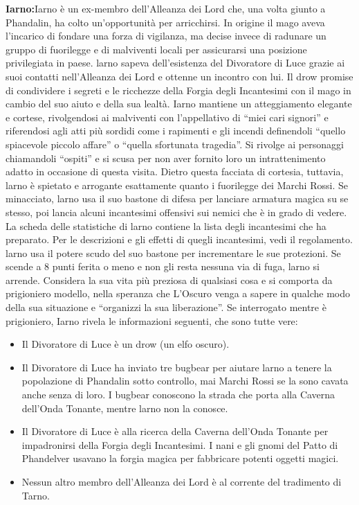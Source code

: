 \documentclass{article}
\begin{document}
\textbf{Iarno:}Iarno è un ex-membro dell'Alleanza dei Lord che, una volta
giunto a Phandalin, ha colto un'opportunità per arricchirsi.
In origine il mago aveva l’incarico di fondare una forza
di vigilanza, ma decise invece di radunare un gruppo di
fuorilegge e di malviventi locali per assicurarsi una posizione
privilegiata in paese.
larno sapeva dell'esistenza del Divoratore di Luce grazie ai suoi
contatti nell’Alleanza dei Lord e ottenne un incontro con lui.
Il drow promise di condividere i segreti e le ricchezze della
Forgia degli Incantesimi con il mago in cambio del suo aiuto e
della sua lealtà.
Iarno mantiene un atteggiamento
elegante e cortese, rivolgendosi ai
malviventi con l'appellativo di “miei
cari signori” e riferendosi agli atti più
sordidi come i rapimenti e gli incendi
definendoli “quello spiacevole piccolo
affare” o “quella sfortunata tragedia”.
Si rivolge ai personaggi chiamandoli
“ospiti” e si scusa per non aver fornito loro
un intrattenimento adatto in occasione
di questa visita. Dietro questa facciata
di cortesia, tuttavia, larno è spietato e
arrogante esattamente quanto i fuorilegge
dei Marchi Rossi.
Se minacciato, larno usa il suo bastone
di difesa per lanciare armatura magica su
se stesso, poi lancia alcuni incantesimi
offensivi sui nemici che è in grado di
vedere. La scheda delle statistiche di larno
contiene la lista degli incantesimi che ha
preparato. Per le descrizioni e gli effetti
di quegli incantesimi, vedi il regolamento.
larno usa il potere scudo del suo bastone
per incrementare le sue protezioni.
Se scende a 8 punti ferita o meno e
non gli resta nessuna via di fuga, larno
si arrende. Considera la sua vita più
preziosa di qualsiasi cosa e si comporta
da prigioniero modello, nella speranza che
L'Oscuro venga a sapere in qualche
modo della sua situazione e “organizzi la
sua liberazione”. Se interrogato mentre è prigioniero,
Iarno rivela le informazioni seguenti, che
sono tutte vere:
\begin{itemize}
    \item Il Divoratore di Luce è un drow (un elfo
oscuro).
    \item Il Divoratore di Luce ha inviato tre bugbear per
aiutare larno a tenere la popolazione di
Phandalin sotto controllo, mai Marchi
Rossi se la sono cavata anche senza di
loro. I bugbear conoscono la strada che
porta alla Caverna dell’Onda Tonante,
mentre larno non la conosce.
    \item Il Divoratore di Luce è alla ricerca della
Caverna dell’Onda Tonante per
impadronirsi della Forgia degli
Incantesimi. I nani e gli gnomi del Patto
di Phandelver usavano la forgia magica
per fabbricare potenti oggetti magici.
    \item Nessun altro membro dell'Alleanza dei
Lord è al corrente del tradimento di
Tarno.
\end{itemize}
\end{document}
